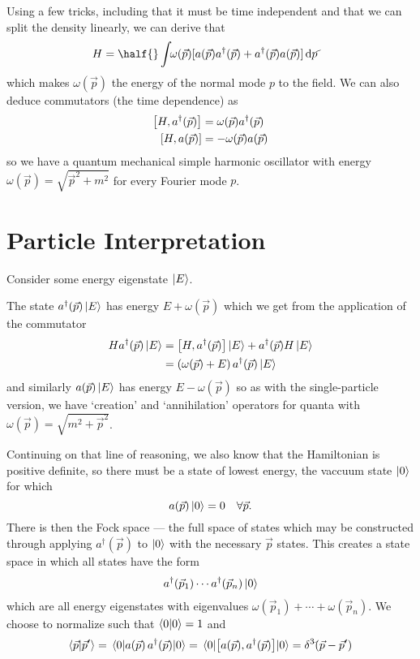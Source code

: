 \documentclass[notes.tex]{subfiles}
\begin{document}
Using a few tricks, including that it must be time independent and that we can split the density linearly, we can derive that 
\begin{align*}
    H &= \half{}\int\!\! \omega(\vec{p})[a(\vec{p})a^\dagger(\vec{p}) + a^\dagger(\vec{p})a(\vec{p})]\,\dds{p}
\end{align*}
which makes $ \omega(\vec{p})$ the energy of the normal mode $p$ to the field.
We can also deduce commutators (\ie the time dependence) as
\begin{align*}
    \commutator{H}{a^\dagger(\vec{p})} &= \omega(\vec{p}) a^\dagger(\vec{p})\\
    \commutator{H}{a(\vec{p})} &= -\omega(\vec{p}) a(\vec{p})
\end{align*}
so we have a quantum mechanical simple harmonic oscillator with energy $\omega(\vec{p}) = \sqrt{\vec{p}^2 + m^2}$ for every Fourier mode $p$.

\section{Particle Interpretation}
Consider some energy eigenstate $\ket{E}$. 

The state $a^\dagger(\vec{p})\ket{E}$ has energy $E+ \omega(\vec{p})$ which we get from the application of the commutator
\begin{align*}
    H a^\dagger(\vec{p}) \ket{E} &= \commutator{H}{a^\dagger(\vec{p})}\ket{E} + a^\dagger(\vec{p})H \ket{E}\\
    &= ( \omega(\vec{p}) + E)\, a^\dagger(\vec{p}) \ket{E}
\end{align*}
and similarly $a(\vec{p})\ket{E}$ has energy $E- \omega(\vec{p})$ so as with the single-particle version, we have `creation' and `annihilation' operators for quanta with $\omega(\vec{p}) = \sqrt{m^2 + \vec{p}^2}$. 

Continuing on that line of reasoning, we also know that the Hamiltonian is positive definite, so there must be a state of lowest energy, the vaccuum state $\ket{0}$ for which $$a(\vec{p})\ket{0} = 0 \quad\forall\vec{p}.$$
There is then the Fock space --- the full space of states which may be constructed through applying $a^\dagger(\vec{p})$ to $\ket{0}$ with the necessary $\vec{p}$ states. This creates a state space in which all states have the form 
\begin{align*}
    a^\dagger(\vec{p}_1)\cdots a^\dagger(\vec{p}_n)\ket{0}
\end{align*}
which are all energy eigenstates with eigenvalues $\omega(\vec{p}_1) + \cdots + \omega(\vec{p}_n)$. We choose to normalize such that $\braket{0}{0} = 1$ and \[\braket{\vec{p}}{\vec{p}^\prime} = \mel{0}{a(\vec{p})\,a^\dagger(\vec{p})}{0} = \mel{0}{\commutator{a(\vec{p})}{a^\dagger(\vec{p})}}{0} = \deltaslash^3(\vec{p} - \vec{p}^\prime)\]
\end{document}
